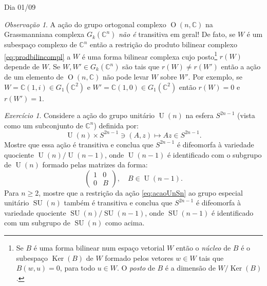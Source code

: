\documentclass[oneside,11pt]{amsart}
\newcommand{\C}{\mathds C}
\DeclareMathOperator{\Ker}{Ker}
\DeclareMathOperator{\Or}{O}
\DeclareMathOperator{\Ur}{U}
\DeclareMathOperator{\SU}{SU}
\theoremstyle{remark}\newtheorem{exercise}{Exercício}[section]
\theoremstyle{plain}\newtheorem{teo}{Teorema}[section]
\theoremstyle{plain}\newtheorem{lem}[teo]{Lema}
\theoremstyle{plain}\newtheorem{prop}[teo]{Proposição}
\theoremstyle{definition}\newtheorem{defin}[teo]{Definição}
\theoremstyle{remark}\newtheorem{rem}[teo]{Observação}
\theoremstyle{definition}\newtheorem{example}[teo]{Exemplo}
\numberwithin{equation}{section}
\begin{document}
\begin{section}{Dia 01/09}
\begin{rem}
A ação do grupo ortogonal complexo $\Or(n,\C)$ na Grassmanniana complexa $G_k(\C^n)$ {\em não é\/} transitiva em geral!
De fato, se $W$ é um subespaço complexo de $\C^n$ então a restrição do produto bilinear complexo \eqref{eq:prodbilincompl} a $W$
é uma forma bilinear complexa cujo posto\footnote{%
Se $B$ é uma forma bilinear num espaço vetorial $W$ então o {\em núcleo\/} de $B$ é o subespaço $\Ker(B)$ de $W$ formado pelos vetores $w\in W$ tais que
$B(w,u)=0$, para todo $u\in W$. O {\em posto\/} de $B$ é a dimensão de $W/\Ker(B)$.}
$r(W)$ depende de $W$. Se $W,W'\in G_k(\C^n)$ são tais que $r(W)\ne r(W')$ então a ação de um elemento
de $\Or(n,\C)$ não pode levar $W$ sobre $W'$. Por exemplo, se $W=\C(1,i)\in G_1(\C^2)$ e $W'=\C(1,0)\in G_1(\C^2)$ então $r(W)=0$ e $r(W')=1$.
\end{rem}

\begin{exercise}\label{exe:esferaquocU}
Considere a ação do grupo unitário $\Ur(n)$ na esfera $S^{2n-1}$ (vista como um subconjunto de $\C^n$) definida por:
\begin{equation}\label{eq:acaoUnSn}
\Ur(n)\times S^{2n-1}\ni(A,z)\longmapsto Az\in S^{2n-1}.
\end{equation}
Mostre que essa ação é transitiva e conclua que $S^{2n-1}$ é difeomorfa à variedade quociente $\Ur(n)/\Ur(n-1)$,
onde $\Ur(n-1)$ é identificado com o subgrupo de $\Ur(n)$ formado pelas matrizes da forma:
\[\begin{pmatrix}1&0\\0&B\end{pmatrix},\quad B\in\Ur(n-1).\]
Para $n\ge2$, mostre que a restrição da ação \eqref{eq:acaoUnSn} ao grupo especial unitário $\SU(n)$ também é transitiva
e conclua que $S^{2n-1}$ é difeomorfa à variedade quociente $\SU(n)/\SU(n-1)$, onde $\SU(n-1)$ é identificado
com um subgrupo de $\SU(n)$ como acima.
\end{exercise}


\end{section}
\end{document}
